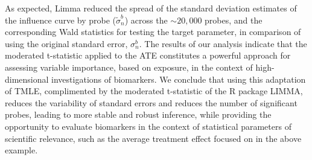 As expected, Limma reduced the spread of the standard deviation estimates of
the influence curve by probe ($\widetilde{\sigma}^b_n$) across the $\sim 20,000$
probes, and the corresponding Wald statistics for testing the target parameter,
in comparison of using the original standard error, $\sigma^b_n$. The results of
our analysis indicate that the moderated t-statistic applied to the ATE
constitutes a powerful approach for assessing variable importance, based on
exposure, in the context of high-dimensional investigations of biomarkers. We
conclude that using this adaptation of TMLE, complimented by the moderated
t-statistic of the R package LIMMA, reduces the variability of standard errors
and reduces the number of significant probes, leading to more stable and robust
inference, while providing the opportunity to evaluate biomarkers in the context
of statistical parameters of scientific relevance, such as the average treatment
effect focused on in the above example.
